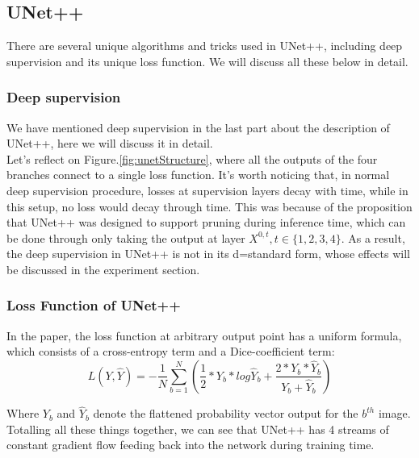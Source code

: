 \subsection{UNet++}
There are several unique algorithms and tricks used in UNet++, including deep supervision and its unique loss function. We will discuss all these below in detail.
\subsubsection{Deep supervision}
We have mentioned deep supervision in the last part about the description of UNet++, here we will discuss it in detail.\\
Let's reflect on Figure.\ref{fig:unetStructure}, where all the outputs of the four branches connect to a single loss function. It's worth noticing that, in normal deep supervision procedure, losses at supervision layers decay with time, while in this setup, no loss would decay through time. This was because of the proposition that UNet++ was designed to support pruning during inference time, which can be done through only taking the output at layer $X^{0,t}, t\in \{1,2,3,4\}$. As a result, the deep supervision in UNet++ is not in its d=standard form, whose effects will be discussed in the experiment section.\\
\subsubsection{Loss Function of UNet++}
In the paper\cite{unet_pp}, the loss function at arbitrary output point has a uniform formula, which consists of a cross-entropy term and a Dice-coefficient term:
\begin{equation}
    \displaystyle L(Y, \hat Y)=-\frac{1}{N}\sum_{b=1}^{N}(\frac12 * Y_b * log\hat Y_b + \frac{2* Y_b*\hat Y_b}{Y_b + \hat Y_b})
\end{equation}

Where $Y_b$ and $\hat Y_b$ denote the flattened probability vector output for the $b^{th}$ image.\\

Totalling all these things together, we can see that UNet++ has 4 streams of constant gradient flow feeding back into the network during training time.